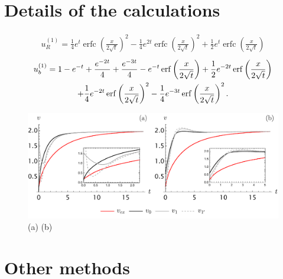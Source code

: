 \documentclass[amsmath,amssymb,amsfonts,aps,pre,preprint,superscriptaddress,bibnotes,showpacs,showkeys,longbibliography]{revtex4-1}
\DeclareMathOperator{\erfc}{erfc}
\begin{document}
\section{Details of the calculations}
\label{sec:Details_of_the_calculculations}
\begin{align}
    u^{(1)}_R = \frac{1}{4} e^t \erfc\left(\frac{x}{2 \sqrt{t}}\right)^2-\frac{1}{4} e^{2 t} \erfc\left(\frac{x}{2 \sqrt{t}}\right)^2+\frac{1}{2} e^t \erfc\left(\frac{x}{2 \sqrt{t}}\right)
\end{align}
\begin{multline}
    u^{(1)}_b 
   =1-e^{-t}+\frac{e^{-2 t}}{4}+\frac{e^{-3 t}}{4}-e^{-t} \erf\left(\frac{x}{2 \sqrt{t}}\right)+\frac{1}{2} e^{-2 t} \erf\left(\frac{x}{2 \sqrt{t}}\right)\\+\frac{1}{4} e^{-2 t} \erf\left(\frac{x}{2 \sqrt{t}}\right)^2-\frac{1}{4} e^{-3 t} \erf\left(\frac{x}{2 \sqrt{t}}\right)^2.
\end{multline}

\begin{figure}[!ht]
    \centering
    \includegraphics[width=\linewidth]{Figures/VelocityMethodsGrid.pdf}
    \caption{(a) (b) }
    \label{fig:VelocityMethodsGrid}
\end{figure}

\section{Other methods}\label{sec:Other_Methods}

\end{document}
